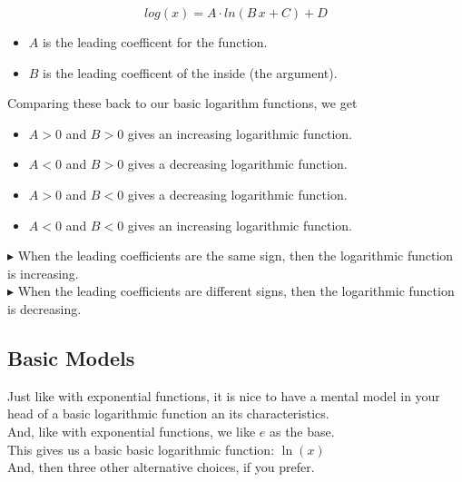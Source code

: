 \documentclass{ximera}
\begin{document}
\[
log(x) = A \cdot ln(B \, x + C) + D
\]


\begin{itemize}
  \item $A$ is the leading coefficent for the function.
  \item $B$ is the leading coefficent of the inside (the argument).
\end{itemize}


Comparing these back to our basic logarithm functions, we get



\begin{itemize}
  \item $A > 0$ and $B > 0$ gives an increasing logarithmic function.
  \item $A < 0$ and $B > 0$ gives a decreasing logarithmic function.
  \item $A > 0$ and $B < 0$ gives a decreasing logarithmic function.
  \item $A < 0$ and $B < 0$ gives an increasing logarithmic function.
\end{itemize}


$\blacktriangleright$ When the leading coefficients are the same sign, then the logarithmic function is increasing. \\

$\blacktriangleright$ When the leading coefficients are different signs, then the logarithmic function is decreasing. \\






\subsection*{Basic Models}



Just like with exponential functions, it is nice to have a mental model in your head of a basic logarithmic function an its characteristics. \\



And, like with exponential functions, we like $e$ as the base. \\


This gives us a basic basic logarithmic function: $\ln(x)$ \\



And, then three other alternative choices, if you prefer. \\
\end{document}
